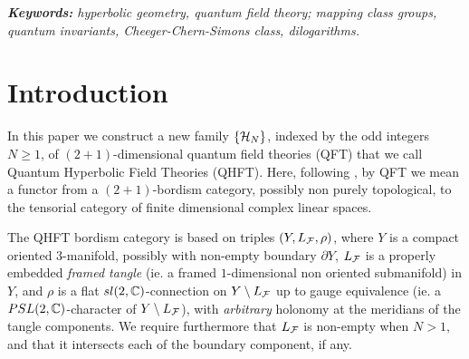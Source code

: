 \begin{abstract}
We construct a new family, indexed by the odd integers $N\geq 1$, of
 $(2+1)$-dimensional quantum field theories called {\it quantum
 hyperbolic field theories} (QHFT), and we study its main structural
 properties. The QHFT are defined for (marked) $(2+1)$-bordisms
 supported by compact oriented $3$-manifolds $Y$ with a properly
 embedded framed tangle $L_\Ff$ and an {\it arbitrary}
 $PSL(2,\C)$-character $\rho$ of $Y \setminus L_\Ff$ (covering, for
 example, the case of hyperbolic cone manifolds). The marking of QHFT
 bordisms includes a specific set of parameters for the space of
 pleated hyperbolic structures on punctured surfaces.  Each QHFT
 associates in a constructive way to any triple $(Y,L_\Ff,\rho)$ with
 marked boundary components a tensor built on the matrix dilogarithms,
 which is holomorphic in the boundary parameters. We establish {\it
 surgery formulas} for QHFT partitions functions and describe their relations
 with the {\it quantum hyperbolic invariants} of \cite{BB1,BB2}
 (either defined for unframed links in closed manifolds and characters
 trivial at the link meridians, or hyperbolic {\it cusped}
 3-manifolds). For every $PSL(2,\mc)$-character of a punctured
 surface, we produce new families of conjugacy classes of ``moderately
 projective" representations of the mapping class groups.
\end{abstract}

\smallskip

\emph{{\bf Keywords:} hyperbolic geometry, quantum field theory;
mapping class groups, quantum invariants, Cheeger-Chern-Simons
class, dilogarithms.}

\section{Introduction}\label{INTRO}

In this paper we construct a new family $\{{\mathcal H}_N\}$, indexed by the odd
integers $N\geq 1$, of $(2+1)$-dimensional quantum field theories
(QFT) that we call Quantum Hyperbolic Field Theories (QHFT). Here,
following \cite{At,T}, by  QFT we mean a functor from a
$(2+1)$-bordism category, possibly non purely topological, to the
tensorial category of finite dimensional complex linear spaces.
\smallskip

The QHFT bordism category is based on triples $(Y,L_\Ff,\rho)$, where
$Y$ is a compact oriented $3$-manifold, possibly with non-empty
boundary $\partial Y$, $L_\Ff$ is a properly embedded {\it framed
tangle} (ie. a framed $1$-dimensional non oriented submanifold) in
$Y$, and $\rho$ is a flat $sl(2,\mathbb{C})$-connection on $Y \setminus
L_\Ff$ up to gauge equivalence (ie. a $PSL(2,\C)$-character of $Y
\setminus L_\Ff$), with {\it arbitrary} holonomy at the meridians of
the tangle components. We require furthermore that $L_\Ff$ is
non-empty when $N>1$, and that it intersects each of the boundary
component, if any.  

